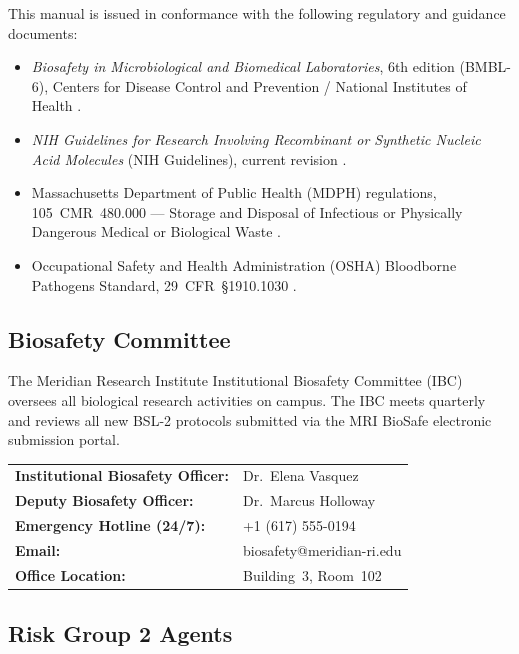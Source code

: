 This manual is issued in conformance with the following regulatory and guidance documents:

\begin{itemize}[leftmargin=1.6em, itemsep=2pt]
  \item \textit{Biosafety in Microbiological and Biomedical Laboratories}, 6th edition
        (BMBL-6), Centers for Disease Control and Prevention / National Institutes of
        Health \cite{BMBL2020}.
  \item \textit{NIH Guidelines for Research Involving Recombinant or Synthetic Nucleic
        Acid Molecules} (NIH Guidelines), current revision \cite{NIHGuidelines2019}.
  \item Massachusetts Department of Public Health (MDPH) regulations,
        105~CMR~480.000 — Storage and Disposal of Infectious or Physically Dangerous
        Medical or Biological Waste \cite{MDPH2022}.
  \item Occupational Safety and Health Administration (OSHA) Bloodborne Pathogens
        Standard, 29~CFR~\S 1910.1030 \cite{OSHA1991}.
\end{itemize}

\subsection{Biosafety Committee}

The Meridian Research Institute Institutional Biosafety Committee (IBC) oversees all
biological research activities on campus. The IBC meets quarterly and reviews all new
BSL-2 protocols submitted via the MRI BioSafe electronic submission portal.

\begin{infobox}
\sffamily\small
\begin{tabular}{@{}ll@{}}
\textbf{Institutional Biosafety Officer:} & Dr.\ Elena Vasquez\\
\textbf{Deputy Biosafety Officer:}        & Dr.\ Marcus Holloway\\
\textbf{Emergency Hotline (24/7):}        & +1 (617) 555-0194\\
\textbf{Email:}                           & biosafety@meridian-ri.edu\\
\textbf{Office Location:}                 & Building~3, Room~102\\
\end{tabular}
\end{infobox}

\subsection{Risk Group 2 Agents}

